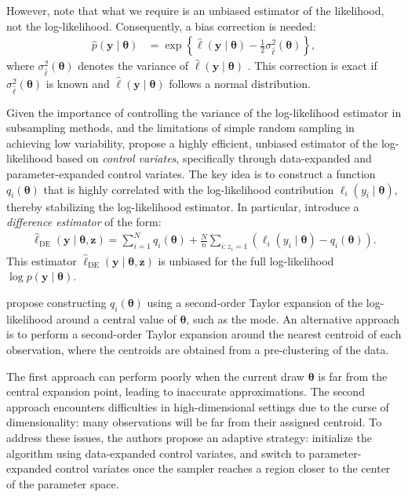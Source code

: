 However, note that what we require is an unbiased estimator of the likelihood, not the log-likelihood. Consequently, a bias correction is needed:
\begin{align*}
	\hat{p}(\mathbf{y} \mid \boldsymbol{\theta}) & = \exp\left\{ \hat{\ell}(\mathbf{y} \mid \boldsymbol{\theta}) - \frac{1}{2} \sigma^2_{\hat{\ell}}(\boldsymbol{\theta}) \right\},
\end{align*}
where \( \sigma^2_{\hat{\ell}}(\boldsymbol{\theta}) \) denotes the variance of \( \hat{\ell}(\mathbf{y} \mid \boldsymbol{\theta}) \) \cite{ceperley1999penalty}. This correction is exact if \( \sigma^2_{\hat{\ell}}(\boldsymbol{\theta}) \) is known and \( \hat{\ell}(\mathbf{y} \mid \boldsymbol{\theta}) \) follows a normal distribution.

Given the importance of controlling the variance of the log-likelihood estimator in subsampling methods, and the limitations of simple random sampling in achieving low variability, \cite{quiroz2019speeding} propose a highly efficient, unbiased estimator of the log-likelihood based on \textit{control variates}, specifically through data-expanded and parameter-expanded control variates. 
The key idea is to construct a function \( q_i(\boldsymbol{\theta}) \) that is highly correlated with the log-likelihood contribution \( \ell_i(y_i \mid \boldsymbol{\theta}) \), thereby stabilizing the log-likelihood estimator. In particular, \cite{quiroz2019speeding} introduce a \textit{difference estimator} of the form:
\begin{align*}
	\hat{\ell}_{\mathrm{DE}}(\mathbf{y} \mid \boldsymbol{\theta}, \mathbf{z}) = \sum_{i=1}^N q_i(\boldsymbol{\theta}) + \frac{N}{n} \sum_{i: z_i = 1} \left( \ell_i(y_i \mid \boldsymbol{\theta}) - q_i(\boldsymbol{\theta}) \right).
\end{align*}
This estimator \( \hat{\ell}_{\mathrm{DE}}(\mathbf{y} \mid \boldsymbol{\theta}, \mathbf{z}) \) is unbiased for the full log-likelihood \( \log p(\mathbf{y} \mid \boldsymbol{\theta}) \).

\cite{quiroz2019speeding} propose constructing \( q_i(\boldsymbol{\theta}) \) using a second-order Taylor expansion of the log-likelihood around a central value of \( \boldsymbol{\theta} \), such as the mode. An alternative approach is to perform a second-order Taylor expansion around the nearest centroid of each observation, where the centroids are obtained from a pre-clustering of the data.

The first approach can perform poorly when the current draw \( \boldsymbol{\theta} \) is far from the central expansion point, leading to inaccurate approximations. The second approach encounters difficulties in high-dimensional settings due to the curse of dimensionality: many observations will be far from their assigned centroid. To address these issues, the authors propose an adaptive strategy: initialize the algorithm using data-expanded control variates, and switch to parameter-expanded control variates once the sampler reaches a region closer to the center of the parameter space.

